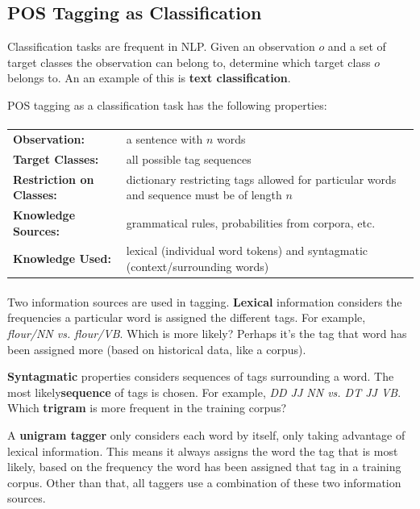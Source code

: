 \documentclass{article}
\begin{document}
\subsection{POS Tagging as Classification}

Classification tasks are frequent in NLP. Given an observation $o$ and a set of target classes the observation can belong to, determine which target class $o$ belongs to. An an example of this is \textbf{text classification}.

POS tagging as a classification task has the following properties:
\paragraph{}
\begin{tabular}{ll}
	\textbf{Observation:} & a sentence with $n$ words \\
	\textbf{Target Classes:} & all possible tag sequences \\
	\textbf{Restriction on Classes:} & dictionary restricting tags allowed for particular words and sequence must be of length $n$ \\
	\textbf{Knowledge Sources:} & grammatical rules, probabilities from corpora, etc. \\
	\textbf{Knowledge Used:} & lexical (individual word tokens) and syntagmatic (context/surrounding words) \\			
\end{tabular}
\paragraph{}

Two information sources are used in tagging. \textbf{Lexical} information considers the frequencies a particular word is assigned the different tags. For example, \textit{flour/NN vs. flour/VB}. Which is more likely? Perhaps it's the tag that word has been assigned more (based on historical data, like a corpus).

\textbf{Syntagmatic} properties considers sequences of tags surrounding a word. The most likely\textbf{sequence} of tags is chosen. For example, \textit{DD JJ NN vs. DT JJ VB}. Which \textbf{trigram} is more frequent in the training corpus?

A \textbf{unigram tagger} only considers each word by itself, only taking advantage of lexical information. This means it always assigns the word the tag that is most likely, based on the frequency the word has been assigned that tag in a training corpus. Other than that, all taggers use a combination of these two information sources.
\end{document}
